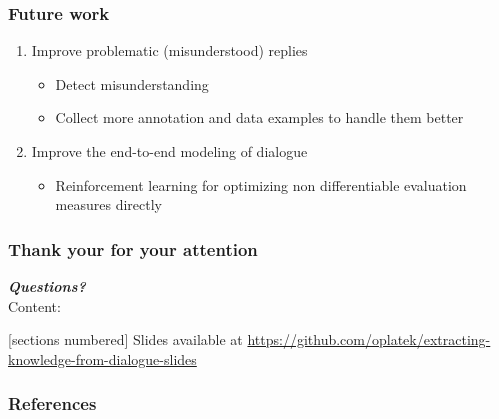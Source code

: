 \documentclass[10pt, compress,british,xcolor={svgnames,dvipsnames,x11names},trans]{beamer}
\begin{document}
\begin{frame}\frametitle{Future work}
    \begin{enumerate}
        \item Improve problematic (misunderstood) replies
            \begin{itemize}
                \item Detect misunderstanding
                \item Collect more annotation and data examples to handle them better
            \end{itemize}
        \item Improve the end-to-end modeling of dialogue
            \begin{itemize}
                \item Reinforcement learning for optimizing non differentiable evaluation measures directly
            \end{itemize}
    \end{enumerate}
\end{frame}




\begin{frame}\frametitle{Thank your for your attention}
    {\bf \large \it Questions?} \\
    \vfill
    Content:

  [sections numbered]
  \tableofcontents
    \vfill
    {\footnotesize Slides available at \url{https://github.com/oplatek/extracting-knowledge-from-dialogue-slides}}

\end{frame}

\appendix

\begin{frame}[allowframebreaks]
        \frametitle{References}
        
        
\end{frame}
\end{document}
